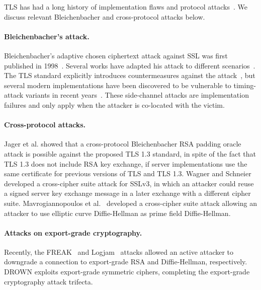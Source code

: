 TLS has had a long history of implementation flaws and protocol
attacks~\cite{poodle-2014,crime-attack,rc4-biases-2013,lucky-13-2013,beast-2011,sloth-2016,heartbleed-2014}.
We discuss relevant Bleichenbacher and cross-protocol attacks below.

\paragraph{Bleichenbacher's attack.}
Bleichenbacher's adaptive chosen ciphertext attack against SSL was first
published in 1998~\cite{bleichenbacher-1998}. Several works have adapted his
attack to different
scenarios~\cite{klima-rsa-tls-2003,efficient-padding-oracle-2012,jager-2012}.
The TLS standard explicitly introduces countermeasures against the
attack~\cite{rfc5246}, but several modern implementations have been
discovered to be vulnerable to timing-attack variants in recent
years~\cite{meyer-2014,zhang-2014}. These side-channel
attacks are implementation failures and only apply when the attacker is
co-located with the victim.

\paragraph{Cross-protocol attacks.}
Jager et al.\@ \cite{tls-quic-pkcs-2015} showed that a cross-protocol
Bleichenbacher RSA padding oracle attack is possible against the proposed TLS
1.3 standard, in spite of the fact that TLS 1.3 does not include RSA key
exchange, if server implementations use the same certificate for previous
versions of TLS and TLS 1.3. Wagner and Schneier~\cite{ssl-v3-1996} developed
a cross-cipher suite attack for SSLv3, in which an attacker could reuse a
signed server key exchange message in a later exchange with a different
cipher suite. Mavrogiannopoulos et al.\@~\cite{mvvp-2012} developed a
cross-cipher suite attack allowing an attacker to use elliptic curve
Diffie-Hellman as prime field Diffie-Hellman.

\paragraph{Attacks on export-grade cryptography.}
Recently, the FREAK~\cite{smack-tls-2015} and Logjam~\cite{logjam-2015}
attacks allowed an active attacker to downgrade a connection to export-grade
RSA and Diffie-Hellman, respectively. DROWN exploits export-grade symmetric
ciphers, completing the export-grade cryptography attack trifecta.
